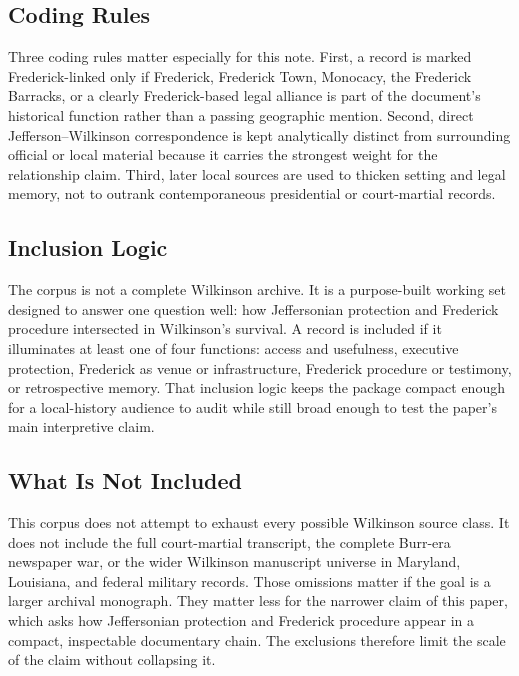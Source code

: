 \subsection*{Coding Rules}

Three coding rules matter especially for this note. First, a record is marked Frederick-linked only if Frederick, Frederick Town, Monocacy, the Frederick Barracks, or a clearly Frederick-based legal alliance is part of the document's historical function rather than a passing geographic mention. Second, direct Jefferson--Wilkinson correspondence is kept analytically distinct from surrounding official or local material because it carries the strongest weight for the relationship claim. Third, later local sources are used to thicken setting and legal memory, not to outrank contemporaneous presidential or court-martial records.

\subsection*{Inclusion Logic}

The corpus is not a complete Wilkinson archive. It is a purpose-built working set designed to answer one question well: how Jeffersonian protection and Frederick procedure intersected in Wilkinson's survival. A record is included if it illuminates at least one of four functions: access and usefulness, executive protection, Frederick as venue or infrastructure, Frederick procedure or testimony, or retrospective memory. That inclusion logic keeps the package compact enough for a local-history audience to audit while still broad enough to test the paper's main interpretive claim.

\subsection*{What Is Not Included}

This corpus does not attempt to exhaust every possible Wilkinson source class. It does not include the full court-martial transcript, the complete Burr-era newspaper war, or the wider Wilkinson manuscript universe in Maryland, Louisiana, and federal military records. Those omissions matter if the goal is a larger archival monograph. They matter less for the narrower claim of this paper, which asks how Jeffersonian protection and Frederick procedure appear in a compact, inspectable documentary chain. The exclusions therefore limit the scale of the claim without collapsing it.

